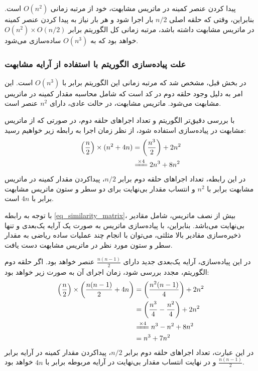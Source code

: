 پیدا کردن عنصر کمینه در ماتریس مشابهت، خود از مرتبه زمانی \(O(n^2)\) است. بنابراین، وقتی که حلقه اصلی \(n/2\) بار اجرا شود و هر بار نیاز به پیدا کردن عنصر کمینه در ماتریس مشابهت داشته باشد، مرتبه زمانی کل الگوریتم برابر \(O(n^2) \times O(n/2)\) خواهد بود که به \(O(n^3)\) ساده‌سازی می‌شود.

\vspace{3mm}
\subsubsection{
	علت پیاده‌سازی الگوریتم با استفاده از آرایه مشابهت
}\vspace{-1mm}
در بخش قبل، مشخص شد که مرتبه زمانی این الگوریتم برابر با \(O(n^3)\) است. این امر به دلیل وجود حلقه دوم در کد است که شامل محاسبه مقدار کمینه در ماتریس مشابهت می‌شود. ماتریس مشابهت، در حالت عادی، دارای \(n^2\) عنصر است.

با بررسی دقیق‌تر الگوریتم و تعداد اجراهای حلقه دوم، در صورتی که از ماتریس مشابهت در پیاده‌سازی استفاده شود، از نظر زمان اجرا به رابطه زیر خواهیم رسید:
\begin{equation}
	\begin{align*} 
		\left(\frac{n}{2}\right) \times (n^2 + 4n) &= \left(\frac{n^3}{2}\right)+2n^2 \\
		 &\xlongequal{\times 4} 2n^3 + 8n^2
	\end{align*}
\end{equation}
در این رابطه، تعداد اجراهای حلقه دوم برابر \(n/2\)، پیداکردن مقدار کمینه در ماتریس مشابهت برابر با \(n^2\) و انتساب مقدار بی‌نهایت برای دو سطر و ستون ماتریس مشابهت برابر با \(4n\) است.

با توجه به رابطه
\ref{eq_similarity_matrix}،
بیش از نصف ماتریس، شامل مقادیر بی‌نهایت می‌باشد. بنابراین، با پیاده‌سازی ماتریس به صورت یک آرایه یک‌بعدی و تنها ذخیره‌سازی مقادیر بالا مثلثی، می‌توان با انجام چند عملیات ساده ریاضی به مقدار سطر و ستون مورد نظر در ماتریس مشابهت دست یافت.

در این پیاده‌سازی، آرایه یک‌بعدی جدید دارای \(\frac{n(n-1)}{2}\) عنصر خواهد بود. اگر حلقه دوم الگوریتم، مجدد بررسی شود، زمان اجرای آن به صورت زیر خواهد بود:
\begin{equation}
	\begin{align*} 
		\left(\frac{n}{2}\right) \times \left(\frac{n(n-1)}{2} + 4n\right) &= \left(\frac{n^2(n-1)}{4} \right)+2n^2 \\
		&= \left(\frac{n^3}{4} - \frac{n^2}{4}\right) +2n^2 \\
		&\xlongequal{\times 4} n^3-n^2+8n^2 \\
		&= n^3+7n^2
	\end{align*}
\end{equation}
در این عبارت، تعداد اجراهای حلقه دوم برابر \(n/2\)، پیداکردن مقدار کمینه در آرایه برابر \(\frac{n(n-1)}{2}\) و در نهایت انتساب مقدار بی‌نهایت در آرایه مربوطه برابر با \(4n\) خواهد بود.


